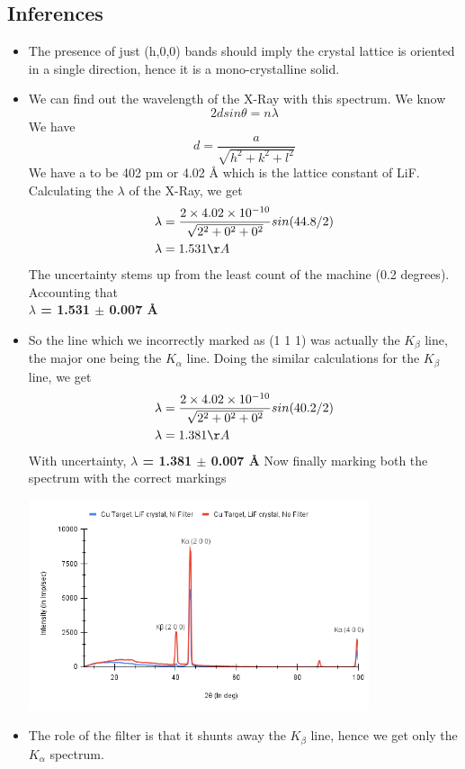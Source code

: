 \documentclass[]{report}[12 pt]
\begin{document}
\subsection*{Inferences}
\begin{itemize}
	\item The presence of just (h,0,0) bands should imply the crystal lattice is oriented in a single direction, hence it is a mono-crystalline solid.
	\item We can find out the wavelength of the X-Ray with this spectrum.
	We know\\
	\begin{equation*}
		2dsin\theta=n\lambda
	\end{equation*}
	We have 
	\[d=\frac{a}{\sqrt{h^2+k^2+l^2}}\]
	We have a to be 402 pm or 4.02 {\AA}  which is the lattice constant of LiF.
	Calculating the $\lambda$ of the X-Ray, we get
	\begin{align*}
		\lambda &= \frac{2\times4.02\times10^{-10}}{\sqrt{2^2+0^2+0^2}} sin(44.8/2)\\
		\lambda &= 1.531 {\AA}
	\end{align*}
	The uncertainty stems up from the least count of the machine (0.2 degrees). Accounting that\\
	\textbf{$\lambda$ = 1.531 $\pm$ 0.007 \AA}
		\item So the line which we incorrectly marked as (1 1 1) was actually the $K_{\beta}$ line, the major one being the $K_{\alpha}$ line. Doing the similar calculations for the $K_{\beta}$  line, we get
			\begin{align*}
			\lambda &= \frac{2\times4.02\times10^{-10}}{\sqrt{2^2+0^2+0^2}} sin(40.2/2)\\
			\lambda &= 1.381 {\AA}
		\end{align*}
	With uncertainty, \textbf{$\lambda$ = 1.381 $\pm$ 0.007 \AA}
	Now finally marking both the spectrum with the correct markings
	\begin{center}
	\includegraphics[width=10cm]{a2.png}
	\end{center}
\item The role of the filter is that it shunts away the $K_{\beta}$ line, hence we get only the $K_{\alpha} $ spectrum.
	\end{itemize}
\end{document}
